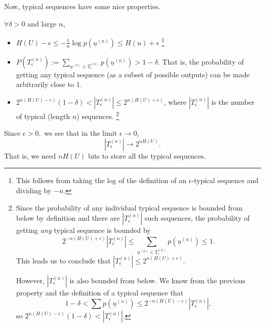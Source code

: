 Now, typical sequences have some nice properties.
\begin{thm}
    $\forall \delta > 0$ and large $n$,
\begin{itemize}
    \item $H(U)-\epsilon \leq -\frac{1}{n}\log p(\underline{u}^{(n)}) \leq H(u)+\epsilon$%
        \footnote{This follows from taking the log of the definition of an $\epsilon$-typical sequence and dividing by $-n$.}
    \item $P(T_\epsilon^{(n)}) := \sum_{\underline {u}^{(n)}\in T_\epsilon^{(n)}} p(\underline{u}^{(n)}) > 1-\delta$. That is, the probability of getting any typical sequence (as a subset of possible outputs) can be made arbitrarily close to $1$.
    \item $2^{n(H(U)-\epsilon)}(1-\delta) < |T_\epsilon^{(n)}| \leq 2^{n(H(U)+\epsilon)}$, where $|T_\epsilon^{(n)}|$ is the number of typical (length $n$) sequences.%
        \footnote{Since the probability of any individual typical sequence is bounded from below by definition and there are $|T_\epsilon^{(n)}|$ such sequences, the probability of getting \emph{any} typical sequence is bounded by
        \begin{equation*}
            2^{-n(H(U)+\epsilon)} |T_\epsilon^{(n)}| \leq \sum_{\underline{u}^{(n)}\in T_\epsilon^{(n)}} p(\underline{u}^{(n)}) \leq 1.
        \end{equation*}
        This leads us to conclude that $|T_\epsilon^{(n)}| \leq 2^{n(H(U)+\epsilon)}.$
        
        However, $|T_\epsilon^{(n)}|$ is also bounded from below. We know from the previous property and the definition of a typical sequence that 
        \begin{equation*}
            1-\delta < \sum p(\underline{u}^{(n)}) \leq 2^{-n(H(U)-\epsilon)}|T_\epsilon^{(n)}|,
        \end{equation*} so $2^{n(H(U)-\epsilon)}(1-\delta) < |T_\epsilon^{(n)}|.$
        }
\end{itemize}
\end{thm}

Since $\epsilon>0,$ we see that in the limit $\epsilon\to 0$,
\begin{equation}
    |T_{\epsilon}^{(n)}| \to 2^{nH(U)}.
\end{equation}
That is, we need $nH(U)$ bits to store all the typical sequences.

